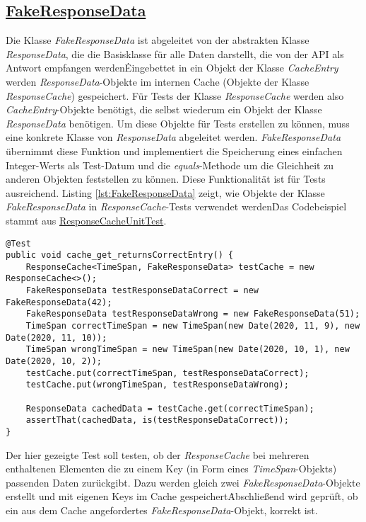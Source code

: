 \newpage
\subsection*{\href{https://github.com/lukaspanni/OpenSourceStats/blob/main/app/src/test/java/de/lukaspanni/opensourcestats/mock/FakeResponseData.java}{FakeResponseData}}
Die Klasse \textit{FakeResponseData} ist abgeleitet von der abstrakten Klasse \textit{ResponseData}, die die Basisklasse für alle Daten darstellt, die von der API als Antwort empfangen werden\.
Eingebettet in ein Objekt der Klasse \textit{CacheEntry} werden \textit{ResponseData}-Objekte im internen Cache (Objekte der Klasse \textit{ResponseCache}) gespeichert.
\newline
Für Tests der Klasse \textit{ResponseCache} werden also \textit{CacheEntry}-Objekte benötigt, die selbst wiederum ein Objekt der Klasse \textit{ResponseData} benötigen.
Um diese Objekte für Tests erstellen zu können, muss eine konkrete Klasse von \textit{ResponseData} abgeleitet werden. \textit{FakeResponseData} übernimmt diese Funktion und implementiert die Speicherung eines einfachen Integer-Werts als Test-Datum und die \textit{equals}-Methode um die Gleichheit zu anderen Objekten feststellen zu können.
Diese Funktionalität ist für Tests ausreichend.
\newline
Listing \ref{lst:FakeResponseData} zeigt, wie Objekte der Klasse \textit{FakeResponseData} in \textit{ResponseCache}-Tests verwendet werden\.
Das Codebeispiel stammt aus \href{https://github.com/lukaspanni/OpenSourceStats/blob/d0f67e73e4692b70316216688b7f556f42ccc11e/app/src/test/java/de/lukaspanni/opensourcestats/ResponseCacheUnitTest.java#L20-L32}{ResponseCacheUnitTest}.
\begin{lstlisting}[caption={Beispielhafte Verwendung von FakeResponseData}, label={lst:FakeResponseData}, captionpos={b}]
@Test
public void cache_get_returnsCorrectEntry() {
    ResponseCache<TimeSpan, FakeResponseData> testCache = new ResponseCache<>();
    FakeResponseData testResponseDataCorrect = new FakeResponseData(42);
    FakeResponseData testResponseDataWrong = new FakeResponseData(51);
    TimeSpan correctTimeSpan = new TimeSpan(new Date(2020, 11, 9), new Date(2020, 11, 10));
    TimeSpan wrongTimeSpan = new TimeSpan(new Date(2020, 10, 1), new Date(2020, 10, 2));
    testCache.put(correctTimeSpan, testResponseDataCorrect);
    testCache.put(wrongTimeSpan, testResponseDataWrong);

    ResponseData cachedData = testCache.get(correctTimeSpan);
    assertThat(cachedData, is(testResponseDataCorrect));
}
\end{lstlisting}
Der hier gezeigte Test soll testen, ob der \textit{ResponseCache} bei mehreren enthaltenen Elementen die zu einem Key (in Form eines \textit{TimeSpan}-Objekts) passenden Daten zurückgibt.
Dazu werden gleich zwei \textit{FakeResponseData}-Objekte erstellt und mit eigenen Keys im Cache gespeichert\.
Abschließend wird geprüft, ob ein aus dem Cache angefordertes \textit{FakeResponseData}-Objekt, korrekt ist.